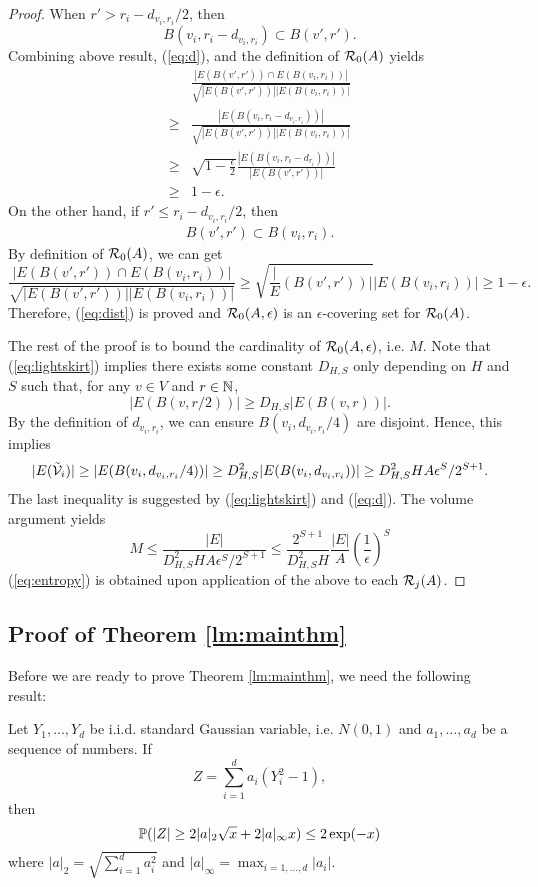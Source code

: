 \begin{proof}
	When $r'>r_i-d_{v_i,r_i}/2$, then 
	$$
	B(v_i,r_i-d_{v_i,r_i})\subset B(v',r').
	$$
	Combining above result, (\ref{eq:d}), and the definition of $\mathcal{R}_0(A)$ yields
	\begin{align*}
	&\frac{|E(B(v',r'))\cap E(B(v_i,r_i)) |}{\sqrt{|E(B(v',r'))||E(B(v_i,r_i))|}}\\
	\ge& \frac{|E(B(v_i,r_i-d_{v_i,r_i})) |}{\sqrt{|E(B(v',r'))||E(B(v_i,r_i))|}} \\
	\ge& \sqrt{1-\frac{\epsilon}{2}}\frac{|E(B(v_i,r_i-d_{r_i}))| }{ |E(B(v',r'))|}\\
	\ge& 1-\epsilon.
	\end{align*}
	On the other hand, if $r'\le r_i-d_{v_i,r_i}/2$, then 
	\begin{align}
	B(v',r')\subset B(v_i,r_i).
	\end{align}
	By definition of $\mathcal{R}_0(A)$, we can get
	$$
	\frac{|E(B(v',r'))\cap E(B(v_i,r_i)) |}{\sqrt{|E(B(v',r'))||E(B(v_i,r_i))|}}\ge \sqrt{\frac|E(B(v',r'))|}{|E(B(v_i,r_i))|}\ge  1-\epsilon.
	$$
	Therefore, (\ref{eq:dist}) is proved and $\mathcal{R}_0(A,\epsilon)$ is an  $\epsilon$-covering set for $\mathcal{R}_0(A)$.
	
	The rest of the proof is to bound the cardinality of $\mathcal{R}_0(A,\epsilon)$, i.e. $M$.
	Note that (\ref{eq:lightskirt}) implies there exists some constant $D_{H,S}$ only depending on $H$ and $S$ such that, for any $v\in V$ and $r\in \mathbb{N}$,
	$$
	|E(B(v,r/2))|\ge D_{H,S} |E(B(v,r))|.
	$$
	By the definition of $d_{v_i, r_i}$, we can ensure $B(v_i,d_{v_i,r_i}/4)$ are disjoint.
	Hence, this implies
	$$
	|E(\tilde{\mathcal{V}}_i) |\ge |E(B(v_i,d_{v_i,r_i}/4))|\ge D_{H,S}^2|E(B(v_i,d_{v_i,r_i}))|\ge D_{H,S}^2 HA\epsilon^S/2^{S+1}.
	$$
	The last inequality is suggested by (\ref{eq:lightskirt}) and (\ref{eq:d}). The volume argument yields
	$$
	M\le \frac{|E|}{D_{H,S}^2 HA\epsilon^S/2^{S+1}}\le \frac{2^{S+1}}{D_{H,S}^2H}\frac{|E|}{A}\left(\frac{1}{ \epsilon}\right)^S
	$$
	(\ref{eq:entropy}) is obtained upon application of the above to each $\mathcal{R}_j(A)$.
\end{proof}

\subsection{Proof of Theorem \ref{lm:mainthm}}
	
Before we are ready to prove Theorem \ref{lm:mainthm}, we need the following result:

\begin{lemma}
	\label{lm:diffbd}
	Let $Y_1,\ldots,Y_d$ be i.i.d. standard Gaussian variable, i.e. $N(0,1)$ and $a_1,\ldots,a_d$ be a sequence of numbers.
	If 
	\begin{equation}
	Z=\sum_{i=1}^d a_i(Y_i^2-1),
	\end{equation}
	then
	\begin{equation}
	\mathbb{P}(|Z|\ge 2|a|_2\sqrt{x}+2|a|_\infty x)\le 2\exp(-x)
	\end{equation}
	where $|a|_2=\sqrt{\sum_{i=1}^d a_i^2}$ and $|a|_\infty=\max_{i=1,\ldots,d}|a_i|$.
\end{lemma}

